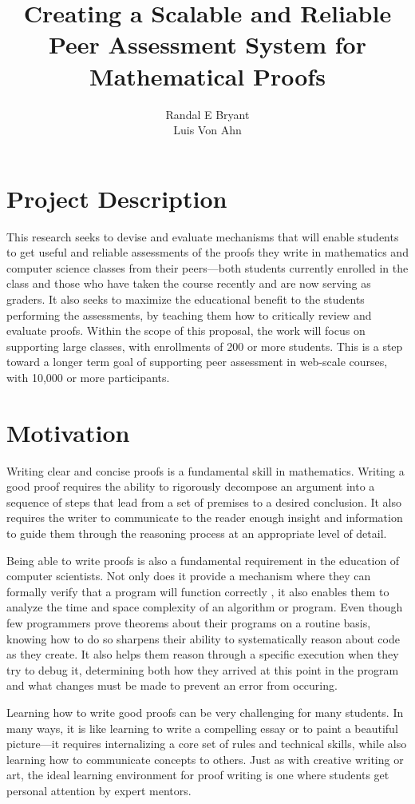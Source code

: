 \documentclass[12pt]{article}
\title{Creating a Scalable and Reliable Peer Assessment System for
  Mathematical Proofs}
\author{Randal E Bryant \\ Luis Von Ahn}
\begin{document}
\section*{Project Description}

This research seeks to devise and evaluate mechanisms that will enable
students to get useful and reliable assessments of the proofs they
write in mathematics and computer science classes from their
peers---both students currently enrolled in the class and those who
have taken the course recently and are now serving as graders.  It
also seeks to maximize the educational benefit to the students
performing the assessments, by teaching them how to critically review
and evaluate proofs.  Within the scope of this proposal, the work will
focus on supporting large classes, with enrollments of 200 or more students.
This is a step toward a longer term goal of supporting peer
assessment in web-scale courses, with 10,000 or more participants.

\section{Motivation}

Writing clear and concise proofs is a fundamental skill
in mathematics.  Writing a good proof requires the ability to
rigorously decompose an argument into a sequence of steps that lead
from a set of premises to
a desired conclusion.  It also requires the
writer to communicate to the reader enough insight and information to guide them
through the reasoning process at an appropriate level of detail.

Being able to write proofs is also a fundamental requirement in the
education of computer scientists.  Not only does it provide a
mechanism where they can formally verify that a program will function
correctly \cite{hoare-cacm69}, it also enables them to analyze the
time and space complexity of an algorithm or program.  Even though few
programmers prove theorems about their programs on a routine basis,
knowing how to do so sharpens their ability to systematically reason
about code as they create.  It also helps them reason through a
specific execution when they try to debug it, determining both how
they arrived at this point in the program and what changes must be
made to prevent an error from occuring.


Learning how to write good proofs can be very challenging for many
students.  In many ways, it is like learning to write a compelling
essay or to paint a beautiful picture---it requires internalizing a
core set of rules and technical skills, while also learning how to
communicate concepts to others.  Just as with creative writing or art,
the ideal learning environment for proof writing is one where
students get personal attention by expert mentors.
\end{document}
